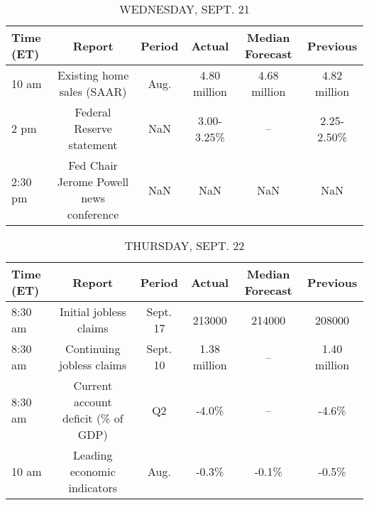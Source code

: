 \documentclass{book}
\begin{document}
  
  
  \begin{table}[htbp]%
  \caption{WEDNESDAY, SEPT. 21}%
  \centering%
  \begin{adjustbox}{width=1\textwidth}%
  \begin{tabular}{lccccc}
  \toprule
  Time (ET) &                                  Report & Period &       Actual & Median Forecast &     Previous \\
  \midrule
      10 am &              Existing home sales (SAAR) &   Aug. & 4.80 million &    4.68 million & 4.82 million \\
       2 pm &               Federal Reserve statement &    NaN &   3.00-3.25\% &              -- &   2.25-2.50\% \\
    2:30 pm & Fed Chair Jerome Powell news conference &    NaN &          NaN &             NaN &          NaN \\
  \bottomrule
  \end{tabular}
  \end{adjustbox}%
  \end{table}
  
  
  
  \begin{table}[htbp]%
  \caption{THURSDAY, SEPT. 22}%
  \centering%
  \begin{adjustbox}{width=1\textwidth}%
  \begin{tabular}{lccccc}
  \toprule
  Time (ET) &                             Report &   Period &       Actual & Median Forecast &     Previous \\
  \midrule
    8:30 am &             Initial jobless claims & Sept. 17 &       213000 &          214000 &       208000 \\
    8:30 am &          Continuing jobless claims & Sept. 10 & 1.38 million &              -- & 1.40 million \\
    8:30 am & Current account deficit (\% of GDP) &       Q2 &        -4.0\% &              -- &        -4.6\% \\
      10 am &        Leading economic indicators &     Aug. &        -0.3\% &           -0.1\% &        -0.5\% \\
  \bottomrule
  \end{tabular}
  \end{adjustbox}%
  \end{table}
  
  
\end{document}

